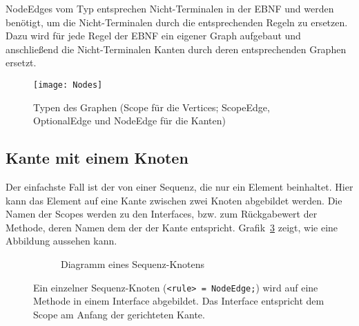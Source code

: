 \documentclass[../InterneDSLs.tex]{subfiles}
\begin{document}
NodeEdges vom Typ  entsprechen Nicht-Terminalen in der EBNF und werden benötigt, um die Nicht-Terminalen durch die entsprechenden Regeln zu ersetzen. Dazu wird für jede Regel der EBNF ein eigener Graph aufgebaut und anschließend die Nicht-Terminalen Kanten durch deren entsprechenden Graphen ersetzt.
\begin{figure}[ht]
\centering
\texttt{[image: Nodes]}
\caption[Typen des Graphen]{Typen des Graphen (Scope für die Vertices; ScopeEdge, OptionalEdge und NodeEdge für die Kanten)}
\label{FIG:GraphTypes}
\end{figure}

\subsection{Kante mit einem Knoten}\label{SEC:OneNode}
Der einfachste Fall ist der von einer Sequenz, die nur ein Element beinhaltet. Hier kann das Element auf eine Kante zwischen zwei Knoten abgebildet werden. Die Namen der Scopes werden zu den Interfaces, bzw. zum Rückgabewert der Methode, deren Namen dem der der Kante entspricht. Grafik~\ref{FIG:OneElementNode} zeigt, wie eine Abbildung aussehen kann.
\begin{figure}[ht]
\centering
  \begin{subfigure}[c]{0.49\textwidth}
    \caption{Diagramm eines Sequenz-Knotens}
    \label{FIG:DiagramOneElementNode}
  \end{subfigure}
  \begin{subfigure}[c]{0.49\textwidth}
    
  \end{subfigure}
  \caption[Abbildung eines Sequenz-Knotens (\texttt{<rule> = NodeEdge;})]{Ein einzelner Sequenz-Knoten (\texttt{<rule> = NodeEdge;}) wird auf eine Methode in einem Interface abgebildet. Das Interface entspricht dem Scope am Anfang der gerichteten Kante.}
  \label{FIG:OneElementNode}
\end{figure}
\end{document}
